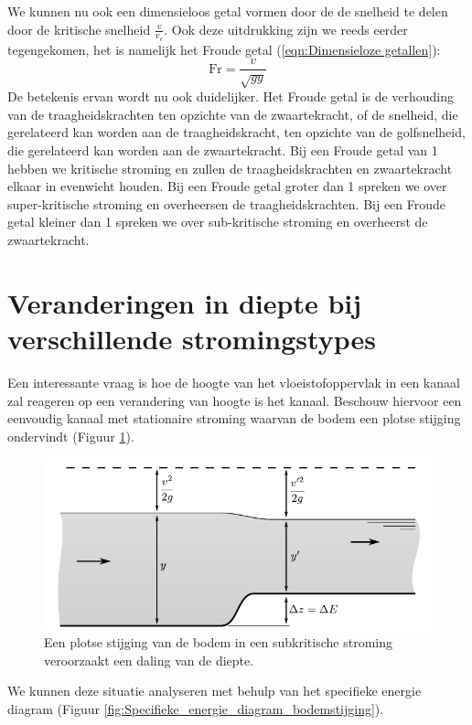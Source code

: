 We kunnen nu ook een dimensieloos getal vormen door de de snelheid te delen door de kritische snelheid $\frac{v}{v_c}$. Ook deze uitdrukking zijn we reeds eerder tegengekomen, het is namelijk het Froude getal (\ref{eqn:Dimensieloze getallen}):
\begin{equation}
	\text{Fr} = \dfrac{v}{\sqrt{g y}}
\end{equation}
De betekenis ervan wordt nu ook duidelijker. Het Froude getal is de verhouding van de traagheidskrachten ten opzichte van de zwaartekracht, of de snelheid, die gerelateerd kan worden aan de traagheidskracht, ten opzichte van de golfsnelheid, die gerelateerd kan worden aan de zwaartekracht. Bij een Froude getal van 1 hebben we kritische stroming en zullen de traagheidskrachten en zwaartekracht elkaar in evenwicht houden. Bij een Froude getal groter dan 1 spreken we over super-kritische stroming en overheersen de traagheidskrachten. Bij een Froude getal kleiner dan 1 spreken we over sub-kritische stroming en overheerst de zwaartekracht.

	\section{Veranderingen in diepte bij verschillende stromingstypes}
Een interessante vraag is hoe de hoogte van het vloeistofoppervlak in een kanaal zal reageren op een verandering van hoogte is het kanaal. Beschouw hiervoor een eenvoudig kanaal met stationaire stroming waarvan de bodem een plotse stijging ondervindt (Figuur \ref{fig:Open_kanaal_bodemstijging_subkritisch}). 
\begin{figure}[htb]
	\centering
	\includegraphics{fig/kanaalstroming/Open_kanaal_bodemstijging_subkritisch}
	\caption{Een plotse stijging van de bodem in een subkritische stroming veroorzaakt een daling van de diepte.}
	\label{fig:Open_kanaal_bodemstijging_subkritisch}
\end{figure}
We kunnen deze situatie analyseren met behulp van het specifieke energie diagram (Figuur \ref{fig:Specifieke_energie_diagram_bodemstijging}).

